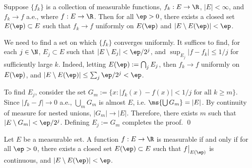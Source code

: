 




\begin{thm}
Suppose $\{f_k\}$ is a collection of measurable functions, $f_k: E \to \R$, $|E|<\infty$, and $f_k \to f$ a.e., where $f: E \to \R$. Then for all $\ep>0$, there exists a closed set $E(\ep) \subset E$ such that $f_k \to f$ uniformly on $E(\ep)$ and $|E \setminus E(\ep)|<\ep$. 
\end{thm}

\pf We need to find a set on which $\{f_k\}$ converges uniformly. It suffices to find, for each $j \in \N$, $E_j \subset E$ such that $|E \setminus E_j|< \ep/2^j$, and $\sup_{E_j} |f-f_k| \leq 1/j$ for sufficiently large $k$. Indeed, letting $E(\ep):= \bigcap_j E_j$, then $f_k \to f$ uniformly on $E(\ep)$, and $|E \setminus E(\ep)| \leq \sum_j \ep/2^j<\ep$. 

To find $E_j$, consider the set $G_m:=\{ x \colon |f_k(x)-f(x)| <1/j \text{ for all } k \geq m\}$. Since $|f_k-f| \to 0$ a.e., $\bigcup_m G_m$ is almost $E$, i.e. $\ms{\bigcup G_m}= |E|$. By continuity of measure for nested unions, $|G_m| \to |E|$. Therefore, there exists $m$ such that $|E \setminus G_m|< \ep/2^j$. Defining $E_j:= G_m$ completes the proof. \qed \\







\begin{thm}
Let $E$ be a measurable set. A function $f: E \to \R$ is measurable if and only if for all $\ep>0$, there exists a closed set $E(\ep) \subset E$ such that $f\big|_{E(\ep)}$ is continuous, and $|E\setminus E(\ep)|<\ep$.
\end{thm}

